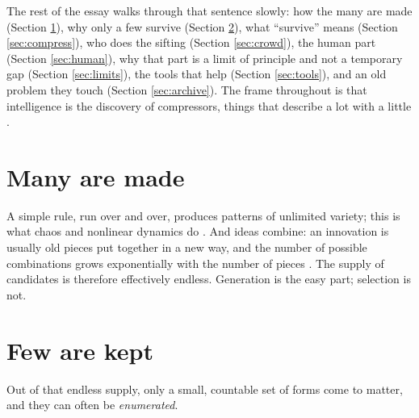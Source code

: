 \documentclass[11pt]{article}
\begin{document}
The rest of the essay walks through that sentence slowly: how the many are made (Section
\ref{sec:make}), why only a few survive (Section \ref{sec:few}), what ``survive'' means (Section
\ref{sec:compress}), who does the sifting (Section \ref{sec:crowd}), the human part (Section
\ref{sec:human}), why that part is a limit of principle and not a temporary gap (Section
\ref{sec:limits}), the tools that help (Section \ref{sec:tools}), and an old problem they touch
(Section \ref{sec:archive}). The frame throughout is that intelligence is
the discovery of compressors, things that describe a lot with a little \cite{gavrilov_compressors}.

\section{Many are made}
\label{sec:make}
A simple rule, run over and over, produces patterns of
unlimited variety; this is what chaos and nonlinear dynamics do \cite{gavrilov_emergence}. And ideas
combine: an innovation is usually old pieces put together in a new way, and the number of possible
combinations grows exponentially with the number of pieces \cite{weitzman1998}. The supply of
candidates is therefore effectively endless. Generation is the easy part; selection is not.

\section{Few are kept}
\label{sec:few}
Out of that endless supply, only a small, countable set of forms come to matter, and they can often
be \emph{enumerated}.
\end{document}

